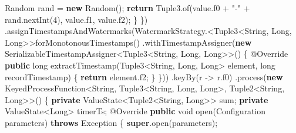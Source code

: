 \documentclass[cn,11pt,chinese]{elegantbook}
\newenvironment{Shaded}{}{}
\newcommand{\AttributeTok}[1]{\textcolor[rgb]{0.49,0.56,0.16}{#1}}
\newcommand{\BuiltInTok}[1]{#1}
\newcommand{\DataTypeTok}[1]{\textcolor[rgb]{0.56,0.13,0.00}{#1}}
\newcommand{\DecValTok}[1]{\textcolor[rgb]{0.25,0.63,0.44}{#1}}
\newcommand{\FunctionTok}[1]{\textcolor[rgb]{0.02,0.16,0.49}{#1}}
\newcommand{\KeywordTok}[1]{\textcolor[rgb]{0.00,0.44,0.13}{\textbf{#1}}}
\newcommand{\NormalTok}[1]{#1}
\newcommand{\StringTok}[1]{\textcolor[rgb]{0.25,0.44,0.63}{#1}}
\begin{document}
\begin{Shaded}
\begin{Highlighting}[]
                    \BuiltInTok{Random}\NormalTok{ rand = }\KeywordTok{new} \BuiltInTok{Random}\NormalTok{();}
                    \KeywordTok{return}\NormalTok{ Tuple3.}\FunctionTok{of}\NormalTok{(value.}\FunctionTok{f0}\NormalTok{ + }\StringTok{"{-}"}\NormalTok{ + rand.}\FunctionTok{nextInt}\NormalTok{(}\DecValTok{4}\NormalTok{), value.}\FunctionTok{f1}\NormalTok{, value.}\FunctionTok{f2}\NormalTok{);}
\NormalTok{                \}}
\NormalTok{            \})}
\NormalTok{            .}\FunctionTok{assignTimestampsAndWatermarks}\NormalTok{(WatermarkStrategy.\textless{}Tuple3\textless{}}\BuiltInTok{String}\NormalTok{, }\BuiltInTok{Long}\NormalTok{, }\BuiltInTok{Long}\NormalTok{\textgreater{}\textgreater{}}\FunctionTok{forMonotonousTimestamps}\NormalTok{()}
\NormalTok{            .}\FunctionTok{withTimestampAssigner}\NormalTok{(}\KeywordTok{new}\NormalTok{ SerializableTimestampAssigner\textless{}Tuple3\textless{}}\BuiltInTok{String}\NormalTok{, }\BuiltInTok{Long}\NormalTok{, }\BuiltInTok{Long}\NormalTok{\textgreater{}\textgreater{}() \{}
                \AttributeTok{@Override}
                \KeywordTok{public} \DataTypeTok{long} \FunctionTok{extractTimestamp}\NormalTok{(Tuple3\textless{}}\BuiltInTok{String}\NormalTok{, }\BuiltInTok{Long}\NormalTok{, }\BuiltInTok{Long}\NormalTok{\textgreater{} element, }\DataTypeTok{long}\NormalTok{ recordTimestamp) \{}
                    \KeywordTok{return}\NormalTok{ element.}\FunctionTok{f2}\NormalTok{;}
\NormalTok{                \}}
\NormalTok{            \}))}
\NormalTok{            .}\FunctionTok{keyBy}\NormalTok{(r {-}\textgreater{} r.}\FunctionTok{f0}\NormalTok{)}
\NormalTok{            .}\FunctionTok{process}\NormalTok{(}\KeywordTok{new}\NormalTok{ KeyedProcessFunction\textless{}}\BuiltInTok{String}\NormalTok{, Tuple3\textless{}}\BuiltInTok{String}\NormalTok{, }\BuiltInTok{Long}\NormalTok{, }\BuiltInTok{Long}\NormalTok{\textgreater{}, Tuple2\textless{}}\BuiltInTok{String}\NormalTok{, }\BuiltInTok{Long}\NormalTok{\textgreater{}\textgreater{}() \{}
                \KeywordTok{private}\NormalTok{ ValueState\textless{}Tuple2\textless{}}\BuiltInTok{String}\NormalTok{, }\BuiltInTok{Long}\NormalTok{\textgreater{}\textgreater{} sum;}
                \KeywordTok{private}\NormalTok{ ValueState\textless{}}\BuiltInTok{Long}\NormalTok{\textgreater{} timerTs;}
                \AttributeTok{@Override}
                \KeywordTok{public} \DataTypeTok{void} \FunctionTok{open}\NormalTok{(}\BuiltInTok{Configuration}\NormalTok{ parameters) }\KeywordTok{throws} \BuiltInTok{Exception}\NormalTok{ \{}
                    \KeywordTok{super}\NormalTok{.}\FunctionTok{open}\NormalTok{(parameters);}

\end{Highlighting}
\end{Shaded}
\end{document}
